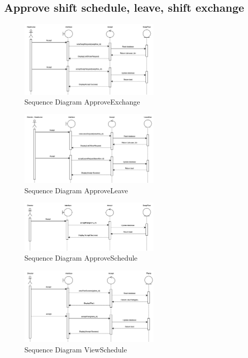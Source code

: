 \subsection{Approve shift schedule, leave, shift exchange}

    \begin{figure}[h]
    \centering
    \includegraphics[width=0.6\textwidth]{Sequence 4.1.png}
    \caption{Sequence Diagram ApproveExchange}
    \end{figure}

    \begin{figure}[h]
    \centering
    \includegraphics[width=0.6\textwidth]{Sequence 4.2.png}
    \caption{Sequence Diagram ApproveLeave}
    \end{figure}

    \begin{figure}[h]
    \centering
    \includegraphics[width=0.6\textwidth]{Sequence 4.3.png}
    \caption{Sequence Diagram ApproveSchedule}
    \end{figure}

    \begin{figure}
    \centering
    \includegraphics[width=0.6\textwidth]{Sequence 4.4.png}
    \caption{Sequence Diagram ViewSchedule}
    \end{figure}

